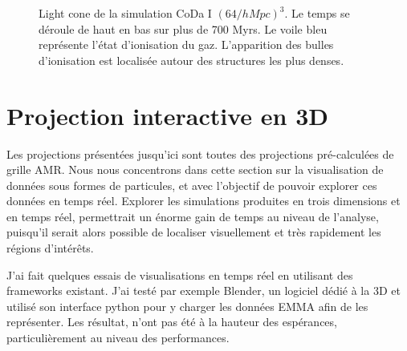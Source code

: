 \begin{figure}
        \caption[Light cone]{Light cone de la simulation CoDa I $(64/h Mpc)^3$. 
        Le temps se déroule de haut en bas sur plus de 700 Myrs.
        Le voile bleu représente l'état d'ionisation du gaz.
        L'apparition des bulles d'ionisation est localisée autour des structures les plus denses.
 }
 		\label{fig:lightcone}
\end{figure}





\section{Projection interactive en 3D}
%
%
%


Les projections présentées jusqu'ici sont toutes des projections pré-calculées de grille \ac{AMR}.
Nous nous concentrons dans cette section sur la visualisation de données sous formes de particules, et avec l'objectif de pouvoir explorer ces données en temps réel.
Explorer les simulations produites en trois dimensions et en temps réel, permettrait un énorme gain de temps au niveau de l'analyse, puisqu'il serait alors possible de localiser visuellement et très rapidement les régions d’intérêts.

J'ai fait quelques essais de visualisations en temps réel en utilisant des frameworks existant.
J'ai testé par exemple Blender, un logiciel dédié à la 3D et utilisé son interface python pour y charger les données EMMA afin de les représenter.
Les résultat, n'ont pas été à la hauteur des espérances, particulièrement au niveau des performances.

